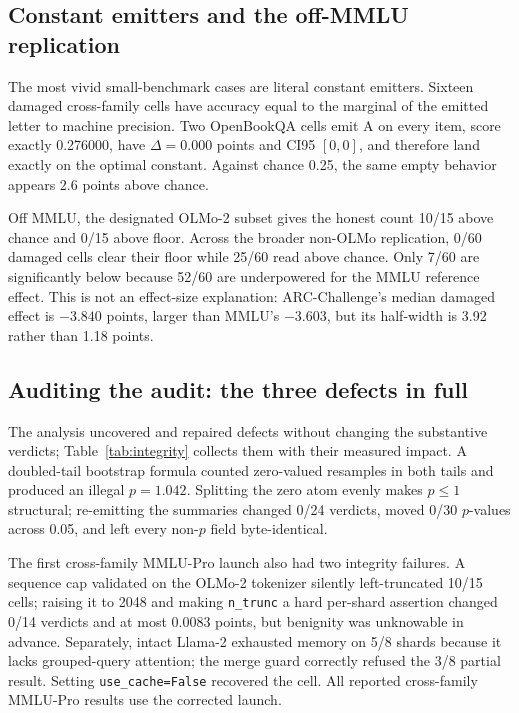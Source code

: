 \subsection{Constant emitters and the off-MMLU replication}
\label{app:offmmlu}

The most vivid small-benchmark cases are literal constant emitters. Sixteen damaged cross-family cells have accuracy equal to the marginal of the emitted letter to machine precision. Two OpenBookQA cells emit A on every item, score exactly 0.276000, have $\Delta=0.000$ points and CI95 $[0,0]$, and therefore land exactly on the optimal constant. Against chance 0.25, the same empty behavior appears 2.6 points above chance.

Off MMLU, the designated OLMo-2 subset gives the honest count 10/15 above chance and 0/15 above floor. Across the broader non-OLMo replication, 0/60 damaged cells clear their floor while 25/60 read above chance. Only 7/60 are significantly below because 52/60 are underpowered for the MMLU reference effect. This is not an effect-size explanation: ARC-Challenge's median damaged effect is $-3.840$ points, larger than MMLU's $-3.603$, but its half-width is 3.92 rather than 1.18 points.

\subsection{Auditing the audit: the three defects in full}
\label{app:audit}

The analysis uncovered and repaired defects without changing the substantive verdicts; Table~\ref{tab:integrity} collects them with their measured impact.
A doubled-tail bootstrap formula counted zero-valued resamples in both tails and produced an illegal $p=1.042$. Splitting the zero atom evenly makes $p\leq1$ structural; re-emitting the summaries changed 0/24 verdicts, moved 0/30 $p$-values across 0.05, and left every non-$p$ field byte-identical.

The first cross-family MMLU-Pro launch also had two integrity failures. A sequence cap validated on the OLMo-2 tokenizer silently left-truncated 10/15 cells; raising it to 2048 and making \texttt{n\_trunc} a hard per-shard assertion changed 0/14 verdicts and at most 0.0083 points, but benignity was unknowable in advance. Separately, intact Llama-2 exhausted memory on 5/8 shards because it lacks grouped-query attention; the merge guard correctly refused the 3/8 partial result. Setting \texttt{use\_cache=False} recovered the cell. All reported cross-family MMLU-Pro results use the corrected launch.
